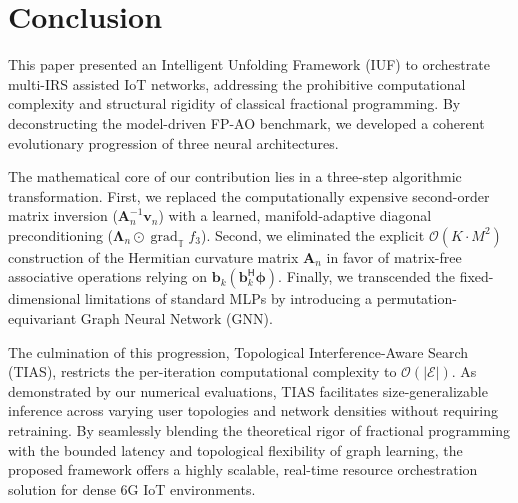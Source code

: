 \documentclass[journal]{IEEEtran}
\newcommand{\herm}{^{\mathsf{H}}}
\begin{document}
\section{Conclusion}
\label{sec:conclusion}

This paper presented an Intelligent Unfolding Framework (IUF) to orchestrate multi-IRS assisted IoT networks, addressing the prohibitive computational complexity and structural rigidity of classical fractional programming. By deconstructing the model-driven FP-AO benchmark, we developed a coherent evolutionary progression of three neural architectures. 

The mathematical core of our contribution lies in a three-step algorithmic transformation. First, we replaced the computationally expensive second-order matrix inversion ($\mathbf{A}_n^{-1} \mathbf{v}_n$) with a learned, manifold-adaptive diagonal preconditioning ($\boldsymbol{\Lambda}_n \odot \operatorname{grad}_{\mathbb{T}} f_3$). Second, we eliminated the explicit $\mathcal{O}(K \cdot M^2)$ construction of the Hermitian curvature matrix $\mathbf{A}_n$ in favor of matrix-free associative operations relying on $\mathbf{b}_k(\mathbf{b}_k\herm \boldsymbol{\phi})$. Finally, we transcended the fixed-dimensional limitations of standard MLPs by introducing a permutation-equivariant Graph Neural Network (GNN). 

The culmination of this progression, Topological Interference-Aware Search (TIAS), restricts the per-iteration computational complexity to $\mathcal{O}(|\mathcal{E}|)$. As demonstrated by our numerical evaluations, TIAS facilitates size-generalizable inference across varying user topologies and network densities without requiring retraining. By seamlessly blending the theoretical rigor of fractional programming with the bounded latency and topological flexibility of graph learning, the proposed framework offers a highly scalable, real-time resource orchestration solution for dense 6G IoT environments.
\end{document}
